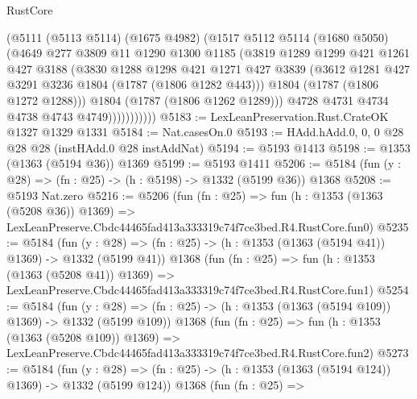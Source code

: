 \begin{lexlean}{RustCore}
\begin{coremodule}
                    (@5111
                      (@5113 @5114)
                      (@1675 @4982)
                      (@1517
                        @5112
                        @5114
                        (@1680 @5050)
                        (@4649
                          @277
                          @3809
                          @11
                          @1290
                          @1300
                          @1185
                          (@3819
                            @1289
                            @1299
                            @421
                            @1261
                            @427
                            @3188
                            (@3830
                              @1288
                              @1298
                              @421
                              @1271
                              @427
                              @3839
                              (@3612 @1281 @427 @3291 @3236 @1804 (@1787 (@1806 @1282 @443)))
                              @1804
                              (@1787 (@1806 @1272 @1288)))
                            @1804
                            (@1787 (@1806 @1262 @1289)))
                          @4728
                          @4731
                          @4734
                          @4738
                          @4743
                          @4749)))))))))))
@5183 := LexLeanPreservation.Rust.CrateOK @1327 @1329 @1331
@5184 := Nat.casesOn.{0}
@5193 := HAdd.hAdd.{0, 0, 0} @28 @28 @28 (instHAdd.{0} @28 instAddNat)
@5194 := @5193 @1413
@5198 := @1353 (@1363 (@5194 @36)) @1369
@5199 := @5193 @1411
@5206 := @5184 (fun (y : @28) => (fn : @25) -> (h : @5198) -> @1332 (@5199 @36)) @1368
@5208 := @5193 Nat.zero
@5216 := @5206
    (fun (fn : @25) =>
    fun (h : @1353 (@1363 (@5208 @36)) @1369) =>
    LexLeanPreserve.Cbdc44465fad413a333319c74f7ce3bed.R4.RustCore.fun0)
@5235 := @5184
    (fun (y : @28) => (fn : @25) -> (h : @1353 (@1363 (@5194 @41)) @1369) -> @1332 (@5199 @41))
    @1368
    (fun (fn : @25) =>
    fun (h : @1353 (@1363 (@5208 @41)) @1369) =>
    LexLeanPreserve.Cbdc44465fad413a333319c74f7ce3bed.R4.RustCore.fun1)
@5254 := @5184
    (fun (y : @28) => (fn : @25) -> (h : @1353 (@1363 (@5194 @109)) @1369) -> @1332 (@5199 @109))
    @1368
    (fun (fn : @25) =>
    fun (h : @1353 (@1363 (@5208 @109)) @1369) =>
    LexLeanPreserve.Cbdc44465fad413a333319c74f7ce3bed.R4.RustCore.fun2)
@5273 := @5184
    (fun (y : @28) => (fn : @25) -> (h : @1353 (@1363 (@5194 @124)) @1369) -> @1332 (@5199 @124))
    @1368
    (fun (fn : @25) =>

\end{coremodule}
\end{lexlean}

